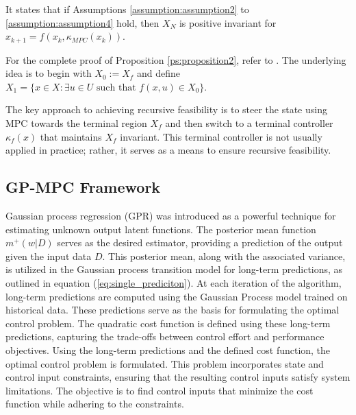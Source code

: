\begin{proposition}\label{ps:proposition2}
   It states that if Assumptions \ref{assumption:assumption2} to \ref{assumption:assumption4} hold, then \( X_N \) is positive invariant for \( x_{k+1} = f(x_k, \kappa_{MPC}(x_k)) \).
\end{proposition}
For the complete proof of Proposition \ref{ps:proposition2}, refer to \cite{rawlings2009model}. The underlying idea is to begin with \( X_0 := X_f \) and define \( X_1 = \{x \in X : \exists u \in U \text{ such that } f(x,u) \in X_0\} \).

The key approach to achieving recursive feasibility is to steer the state using MPC towards the terminal region \( X_f \) and then switch to a terminal controller \( \kappa_f(x) \) that maintains \( X_f \) invariant. This terminal controller is not usually applied in practice; rather, it serves as a means to ensure recursive feasibility. 




 
\subsection{GP-MPC Framework }\label{sec:section3.2}
 Gaussian process regression (GPR) was introduced as a powerful technique for estimating unknown output latent functions. The posterior mean function $m^+(w|D)$ serves as the desired estimator, providing a prediction of the output given the input data $D$. This posterior mean, along with the associated variance, is utilized in the Gaussian process transition model for long-term predictions, as outlined in equation (\ref{eq:single_prediciton}). At each iteration of the algorithm, long-term predictions are computed using the Gaussian Process model trained on historical data. These predictions serve as the basis for formulating the optimal control problem\cite{kamthe2018}. The quadratic cost function is defined using these long-term predictions, capturing the trade-offs between control effort and performance objectives. Using the long-term predictions and the defined cost function, the optimal control problem is formulated. This problem incorporates state and control input constraints, ensuring that the resulting control inputs satisfy system limitations. The objective is to find control inputs that minimize the cost function while adhering to the constraints.
 
